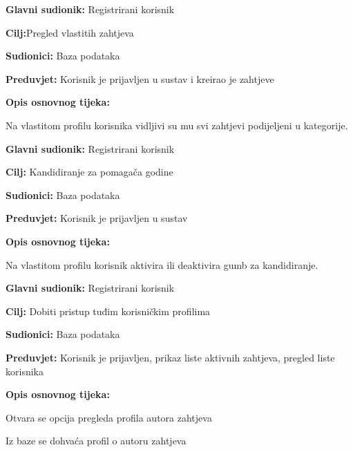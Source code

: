 \noindent {}
\begin{packed_item}
	\item \textbf{Glavni sudionik: }Registrirani korisnik
	\item  \textbf{Cilj:}Pregled vlastitih zahtjeva
	\item  \textbf{Sudionici:} Baza podataka
	\item  \textbf{Preduvjet:} Korisnik je prijavljen u sustav i kreirao je zahtjeve
	\item  \textbf{Opis osnovnog tijeka:}
	\item[] \begin{packed_enum}
		\item Na vlastitom profilu korisnika vidljivi su mu svi zahtjevi podijeljeni u kategorije.
	\end{packed_enum}
\end{packed_item}

\noindent {}
\begin{packed_item}
	\item \textbf{Glavni sudionik: }Registrirani korisnik
	\item  \textbf{Cilj:} Kandidiranje za pomagača godine
	\item  \textbf{Sudionici:} Baza podataka
	\item  \textbf{Preduvjet:} Korisnik je prijavljen u sustav 
	\item  \textbf{Opis osnovnog tijeka:}
	\item[] \begin{packed_enum}
		\item Na vlastitom profilu korisnik aktivira ili deaktivira gumb za kandidiranje.
	\end{packed_enum}
\end{packed_item}

\noindent {}
\begin{packed_item}
	\item \textbf{Glavni sudionik: } Registrirani korisnik
	\item  \textbf{Cilj:} Dobiti pristup tuđim korisničkim profilima
	\item  \textbf{Sudionici:} Baza podataka
	\item  \textbf{Preduvjet:} Korisnik je prijavljen, prikaz liste aktivnih zahtjeva, pregled liste korisnika
	\item  \textbf{Opis osnovnog tijeka:}
	\item[] \begin{packed_enum}
		\item Otvara se opcija pregleda profila autora zahtjeva
		\item Iz baze se dohvaća profil o autoru zahtjeva
	\end{packed_enum}
	
\end{packed_item}

